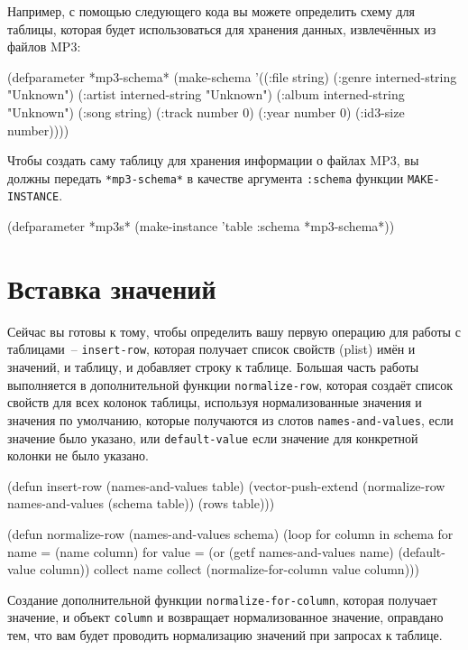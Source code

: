 Например, с помощью следующего кода вы можете определить схему для таблицы, которая будет
использоваться для хранения данных, извлечённых из файлов MP3:

\begin{myverb}
(defparameter *mp3-schema* 
  (make-schema 
   '((:file     string)
     (:genre    interned-string "Unknown")
     (:artist   interned-string "Unknown")
     (:album    interned-string "Unknown")
     (:song     string)
     (:track    number 0)
     (:year     number 0)
     (:id3-size number))))
\end{myverb}

Чтобы создать саму таблицу для хранения информации о файлах MP3, вы должны передать
\lstinline{*mp3-schema*} в качестве аргумента \lstinline{:schema} функции \lstinline{MAKE-INSTANCE}.

\begin{myverb}
(defparameter *mp3s* (make-instance 'table :schema *mp3-schema*))
\end{myverb}

\section{Вставка значений}

Сейчас вы готовы к тому, чтобы определить вашу первую операцию для работы с таблицами~--
\lstinline{insert-row}, которая получает список свойств (plist) имён и значений, и таблицу, и
добавляет строку к таблице.  Большая часть работы выполняется в дополнительной функции
\lstinline{normalize-row}, которая создаёт список свойств для всех колонок таблицы, используя
нормализованные значения и значения по умолчанию, которые получаются из слотов
\lstinline{names-and-values}, если значение было указано, или \lstinline{default-value} если
значение для конкретной колонки не было указано.

\begin{myverb}
(defun insert-row (names-and-values table)
  (vector-push-extend (normalize-row names-and-values (schema table)) (rows table)))

(defun normalize-row (names-and-values schema)
  (loop
     for column in schema
     for name  = (name column)
     for value = (or (getf names-and-values name) (default-value column))
     collect name
     collect (normalize-for-column value column)))
\end{myverb}

Создание дополнительной функции \lstinline{normalize-for-column}, которая получает значение, и
объект \lstinline{column} и возвращает нормализованное значение, оправдано тем, что вам будет
проводить нормализацию значений при запросах к таблице.

